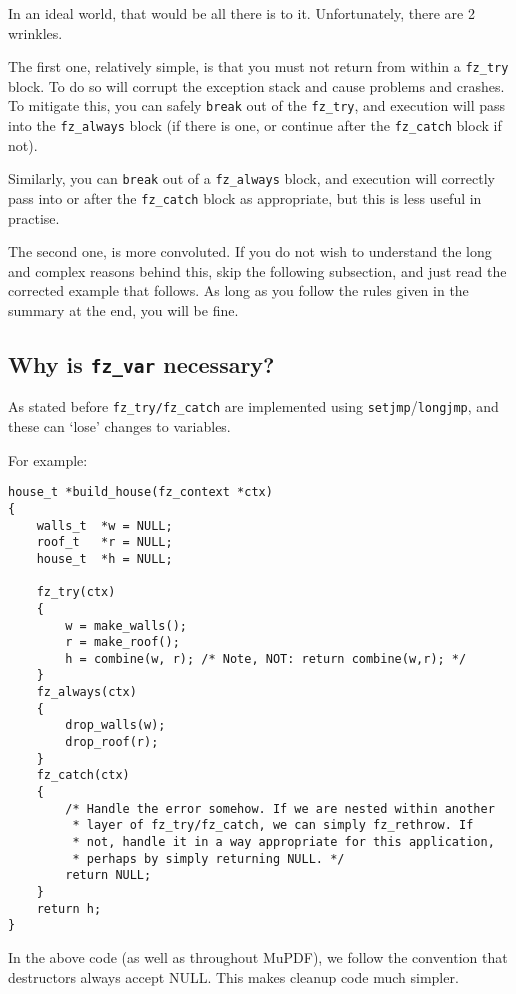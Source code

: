 \documentclass[oneside]{book}
\begin{document}
In an ideal world, that would be all there is to it. Unfortunately, there are 2 wrinkles.

The first one, relatively simple, is that you must not return from within a \texttt{fz\_try} block. To do so will corrupt the exception stack and cause problems and crashes. To mitigate this, you can safely \texttt{break} out of the \texttt{fz\_try}, and execution will pass into the \texttt{fz\_always} block (if there is one, or continue after the \texttt{fz\_catch} block if not).

Similarly, you can \texttt{break} out of a \texttt{fz\_always} block, and execution will correctly pass into or after the \texttt{fz\_catch} block as appropriate, but this is less useful in practise.

The second one, is more convoluted. If you do not wish to understand the long and complex reasons behind this, skip the following subsection, and just read the corrected example that follows. As long as you follow the rules given in the summary at the end, you will be fine.

\subsection{Why is \texttt{fz\_var} necessary?}

As stated before \texttt{fz\_try\slash}\texttt{fz\_catch} are implemented using \texttt{setjmp}\slash \texttt{longjmp}, and these can `lose' changes to variables.

For example:

\begin{lstlisting}
house_t *build_house(fz_context *ctx)
{
    walls_t  *w = NULL;
    roof_t   *r = NULL;
    house_t  *h = NULL;

    fz_try(ctx)
    {
        w = make_walls();
        r = make_roof();
        h = combine(w, r); /* Note, NOT: return combine(w,r); */
    }
    fz_always(ctx)
    {
        drop_walls(w);
        drop_roof(r);
    }
    fz_catch(ctx)
    {
        /* Handle the error somehow. If we are nested within another
         * layer of fz_try/fz_catch, we can simply fz_rethrow. If
         * not, handle it in a way appropriate for this application,
         * perhaps by simply returning NULL. */
        return NULL;
    }
    return h;
}
\end{lstlisting}

In the above code (as well as throughout MuPDF), we follow the convention that destructors always accept NULL. This makes cleanup code much simpler.
\end{document}
